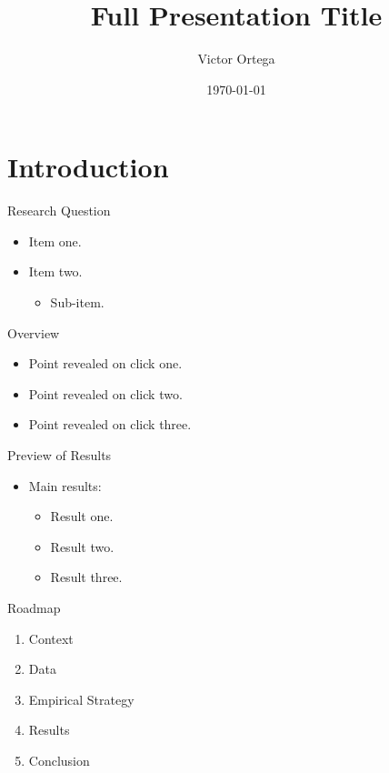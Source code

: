 \documentclass[notes=hide,subsection=false]{beamer}
\title[Short Title]{Full Presentation Title}
\author[Ortega]{Victor Ortega}
\institute[Columbia]{Department of Economics\\Columbia University}
\date{\today}
\begin{document}
\begin{frame}
    \titlepage
\end{frame}

\section{Introduction}

\begin{frame}{Research Question}
    \begin{itemize}
        \item Item one.
        \item Item two.
        \begin{itemize}
            \item Sub-item.
        \end{itemize}
    \end{itemize}
\end{frame}

\begin{frame}{Overview}
    \begin{itemize}
        \item<+-> Point revealed on click one.
        \item<+-> Point revealed on click two.
        \item<+-> Point revealed on click three.
    \end{itemize}
\end{frame}

\begin{frame}{Preview of Results}
    \begin{itemize}
        \item Main results:
        \begin{itemize}
            \item<+-> Result one.
            \item<+-> Result two.
            \item<+-> Result three.
        \end{itemize}
    \end{itemize}
\end{frame}

\begin{frame}{Roadmap}
    \begin{enumerate}
        \item Context
        \item Data
        \item Empirical Strategy
        \item Results
        \item Conclusion
    \end{enumerate}
\end{frame}
\end{document}
